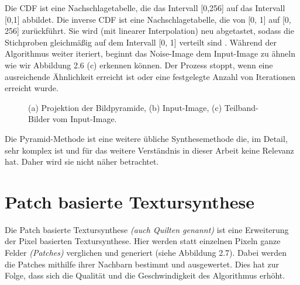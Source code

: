 \documentclass[12pt, a4paper,twoside,openany]{report} %
\begin{document}
Die CDF ist eine Nachschlagetabelle, die das Intervall {[0,256]} auf das Intervall {[0,1]} abbildet.
Die inverse CDF ist eine Nachschlagetabelle, die von {[0, 1]} auf {[0, 256]} zurückführt.
Sie wird {(mit linearer Interpolation)} neu abgetastet,
sodass die Stichproben gleichmäßig auf dem Intervall {[0, 1]} verteilt sind \cite{Heeger}.
\newline
Während der Algorithmus weiter iteriert, beginnt das Noise-Image dem Input-Image zu ähneln wie wir Abbildung 2.6 {(c)} erkennen können.
Der Prozess stoppt, wenn eine ausreichende Ähnlichkeit erreicht ist oder eine festgelegte Anzahl von Iterationen erreicht wurde.

\begin{figure}[H]
    \centering
    \qquad
    \qquad
    \caption{(a) Projektion der Bildpyramide, (b) Input-Image, (c) Teilband-Bilder vom Input-Image.}%
\end{figure}

Die Pyramid-Methode ist eine weitere übliche Synthesemethode die, im Detail, sehr komplex ist und für das weitere Verständnis in dieser Arbeit keine Relevanz hat.
Daher wird sie nicht näher betrachtet.

\section{Patch basierte Textursynthese}

Die Patch basierte Textursynthese \textit{(auch Quilten genannt)} ist eine Erweiterung der Pixel basierten Textursynthese.
Hier werden statt einzelnen Pixeln ganze Felder \textit{(Patches)} verglichen und generiert {(siehe Abbildung 2.7)}.
Dabei werden die Patches mithilfe ihrer Nachbarn bestimmt und ausgewertet.
Dies hat zur Folge, dass sich die Qualität und die Geschwindigkeit des Algorithmus erhöht.
\end{document}
